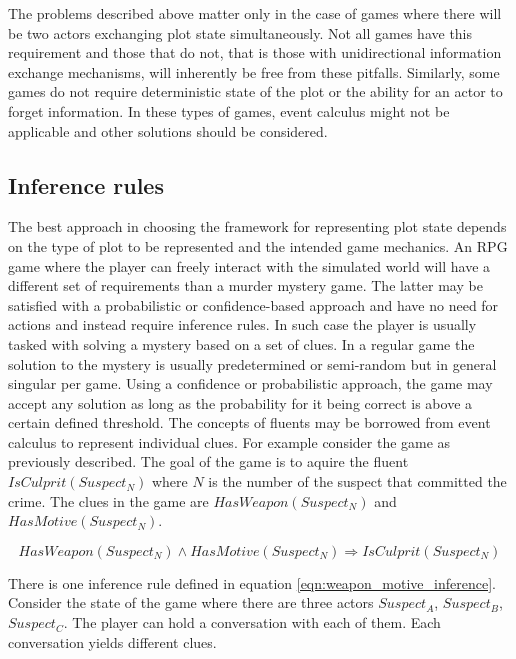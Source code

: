 The problems described above matter only in the case of games where there will be two actors exchanging plot state simultaneously.
Not all games have this requirement and those that do not, that is those with unidirectional information exchange mechanisms, will inherently be free from these pitfalls.
Similarly, some games do not require deterministic state of the plot or the ability for an actor to forget information.
In these types of games, event calculus might not be applicable and other solutions should be considered.

\subsection {Inference rules}

The best approach in choosing the framework for representing plot state depends on the type of plot to be represented and the intended game mechanics.
An RPG game where the player can freely interact with the simulated world will have a different set of requirements than a murder mystery game.
The latter may be satisfied with a probabilistic or confidence-based approach and have no need for actions and instead require inference rules.
In such case the player is usually tasked with solving a mystery based on a set of clues.
In a regular game the solution to the mystery is usually predetermined or semi-random but in general singular per game.
Using a confidence or probabilistic approach, the game may accept any solution as long as the probability for it being correct is above a certain defined threshold.
The concepts of fluents may be borrowed from event calculus to represent individual clues.
For example consider the game as previously described.
The goal of the game is to aquire the fluent $IsCulprit \left( Suspect_N \right)$ where $N$ is the number of the suspect that committed the crime.
The clues in the game are $HasWeapon \left( Suspect_N \right)$ and $HasMotive \left( Suspect_N \right)$.

\begin{equation}
    \label{eqn:weapon_motive_inference}
    HasWeapon \left( Suspect_N \right) \land HasMotive \left( Suspect_N \right) \Rightarrow  IsCulprit \left( Suspect_N \right)
\end{equation}

There is one inference rule defined in equation \ref{eqn:weapon_motive_inference}.
Consider the state of the game where there are three actors $Suspect_A$, $Suspect_B$, $Suspect_C$.
The player can hold a conversation with each of them.
Each conversation yields different clues.

